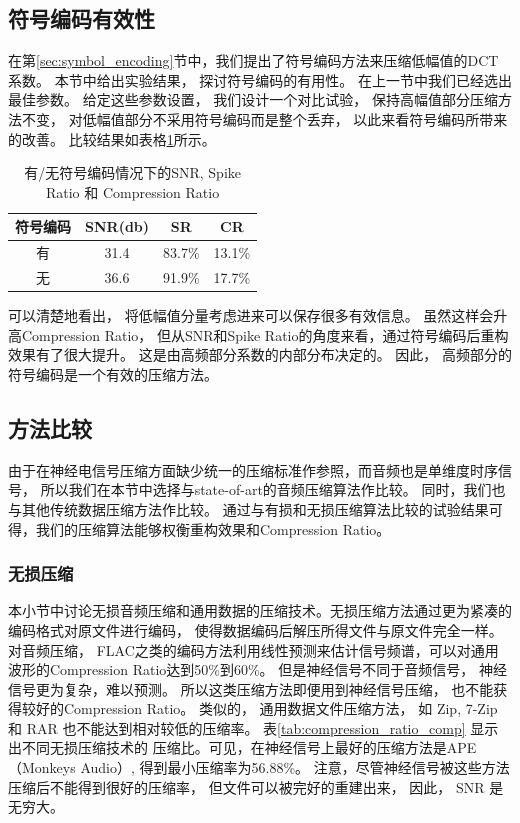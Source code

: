 \subsection{符号编码有效性}
在第\ref{sec:symbol_encoding}节中，我们提出了符号编码方法来压缩低幅值的DCT系数。 本节中给出实验结果， 探讨符号编码的有用性。 在上一节中我们已经选出最佳参数。 给定这些参数设置， 我们设计一个对比试验， 保持高幅值部分压缩方法不变， 对低幅值部分不采用符号编码而是整个丢弃， 以此来看符号编码所带来的改善。 比较结果如表格\ref{tab:T1}所示。\\


\begin{table}[ht]
\centering
  \caption{有/无符号编码情况下的SNR, Spike Ratio 和 Compression Ratio}
  \begin{tabular}{c c c c}
  \hline\hline
  符号编码 & SNR(db) & SR & CR \\ [0.5ex] %
  \hline
  有 & 31.4 & 83.7\% & 13.1\% \\
  无 & 36.6 & 91.9\% & 17.7\% \\
  \hline
  \end{tabular}
  \centering \label{tab:T1}
\end{table}


可以清楚地看出， 将低幅值分量考虑进来可以保存很多有效信息。 虽然这样会升高Compression Ratio， 但从SNR和Spike Ratio的角度来看，通过符号编码后重构效果有了很大提升。 这是由高频部分系数的内部分布决定的。 因此， 高频部分的符号编码是一个有效的压缩方法。



\subsection{方法比较}
由于在神经电信号压缩方面缺少统一的压缩标准作参照，而音频也是单维度时序信号， 所以我们在本节中选择与state-of-art的音频压缩算法作比较。 同时，我们也与其他传统数据压缩方法作比较。 通过与有损和无损压缩算法比较的试验结果可得，我们的压缩算法能够权衡重构效果和Compression Ratio。


\subsubsection{无损压缩}
本小节中讨论无损音频压缩和通用数据的压缩技术。无损压缩方法通过更为紧凑的编码格式对原文件进行编码， 使得数据编码后解压所得文件与原文件完全一样。 对音频压缩， FLAC之类的编码方法利用线性预测来估计信号频谱，可以对通用波形的Compression Ratio达到50\%到60\%\cite{23}。 但是神经信号不同于音频信号， 神经信号更为复杂，难以预测。 所以这类压缩方法即便用到神经信号压缩， 也不能获得较好的Compression Ratio。 类似的， 通用数据文件压缩方法， 如 Zip, 7-Zip 和 RAR 也不能达到相对较低的压缩率。 表\ref{tab:compression_ratio_comp} 显示出不同无损压缩技术的
压缩比。可见，在神经信号上最好的压缩方法是APE （Monkeys Audio）, 得到最小压缩率为56.88\%。 注意，尽管神经信号被这些方法压缩后不能得到很好的压缩率， 但文件可以被完好的重建出来， 因此， SNR 是无穷大。 


